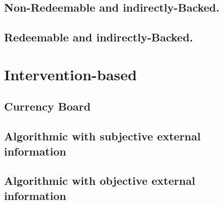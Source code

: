 \subsection{Non-Redeemable and indirectly-Backed.}


\subsection{Redeemable and indirectly-Backed.}



\section{Intervention-based} %

 
\subsection{Currency Board}

\subsection{Algorithmic with subjective external information}

\subsection{Algorithmic with objective external information}

